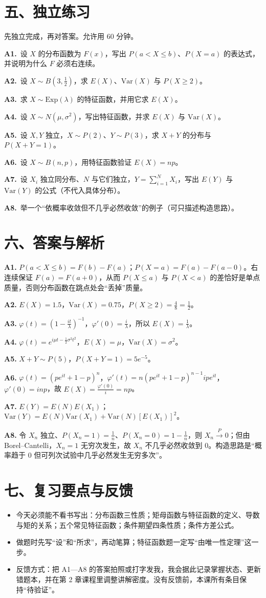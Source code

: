 \documentclass[UTF8,a4paper,11pt]{ctexart}
\newcommand{\CompactQuestion}[2]{\par\noindent\textbf{#1.}\ #2\par\vspace{.8em}}
\begin{document}
\section{五、独立练习}
先独立完成，再对答案。允许用 60 分钟。

\CompactQuestion{A1}{设 $X$ 的分布函数为 $F(x)$，写出 $P(a<X\le b)$、$P(X=a)$ 的表达式，并说明为什么 $F$ 必须右连续。}
\CompactQuestion{A2}{设 $X\sim B(3,\frac12)$，求 $E(X)$、$\mathrm{Var}(X)$ 与 $P(X\ge 2)$。}
\CompactQuestion{A3}{求 $X\sim \mathrm{Exp}(\lambda)$ 的特征函数，并用它求 $E(X)$。}
\CompactQuestion{A4}{设 $X\sim N(\mu,\sigma^2)$，写出特征函数，并求 $E(X)$ 与 $\mathrm{Var}(X)$。}
\CompactQuestion{A5}{设 $X,Y$ 独立，$X\sim P(2)$、$Y\sim P(3)$，求 $X+Y$ 的分布与 $P(X+Y=1)$。}
\CompactQuestion{A6}{设 $X\sim B(n,p)$，用特征函数验证 $E(X)=np$。}
\CompactQuestion{A7}{设 $X_i$ 独立同分布、$N$ 与它们独立，$Y=\sum_{i=1}^N X_i$，写出 $E(Y)$ 与 $\mathrm{Var}(Y)$ 的公式（不代入具体分布）。}
\CompactQuestion{A8}{举一个“依概率收敛但不几乎必然收敛”的例子（可只描述构造思路）。}
\clearpage
{}
\section{六、答案与解析}
\textbf{A1.} $P(a<X\le b)=F(b)-F(a)$；$P(X=a)=F(a)-F(a-0)$。右连续保证 $F(a)=F(a+0)$，从而 $P(X\le a)$ 与 $P(X<a)$ 的差恰好是单点质量，否则分布函数在跳点处会“丢掉”质量。

\textbf{A2.} $E(X)=1.5$，$\mathrm{Var}(X)=0.75$，$P(X\ge2)=\frac{4}{8}=\frac12$。

\textbf{A3.} $\varphi(t)=\left(1-\frac{it}{\lambda}\right)^{-1}$，$\varphi'(0)=\frac{i}{\lambda}$，所以 $E(X)=\frac{1}{\lambda}$。

\textbf{A4.} $\varphi(t)=e^{i\mu t-\frac12\sigma^2t^2}$，$E(X)=\mu$，$\mathrm{Var}(X)=\sigma^2$。

\textbf{A5.} $X+Y\sim P(5)$，$P(X+Y=1)=5e^{-5}$。

\textbf{A6.} $\varphi(t)=(pe^{it}+1-p)^n$，$\varphi'(t)=n(pe^{it}+1-p)^{n-1}ipe^{it}$，$\varphi'(0)=inp$，故 $E(X)=\frac{\varphi'(0)}{i}=np$。

\textbf{A7.} $E(Y)=E(N)E(X_1)$；$\mathrm{Var}(Y)=E(N)\mathrm{Var}(X_1)+\mathrm{Var}(N)[E(X_1)]^2$。

\textbf{A8.} 令 $X_n$ 独立、$P(X_n=1)=\frac1n$、$P(X_n=0)=1-\frac1n$，则 $X_n\xrightarrow{P}0$；但由 Borel–Cantelli，$X_n=1$ 无穷次发生，故 $X_n$ 不几乎必然收敛到 0。构造思路是“概率趋于 0 但可列次试验中几乎必然发生无穷多次”。

\section{七、复习要点与反馈}
\begin{itemize}
\item 今天必须能不看书写出：分布函数三性质；矩母函数与特征函数的定义、导数与矩的关系；五个常见特征函数；条件期望四条性质；条件方差公式。
\item 做题时先写“设”和“所求”，再动笔算；特征函数题一定写“由唯一性定理”这一步。
\item 反馈方式：把 A1—A8 的答案拍照或打字发我，我会据此记录掌握状态、更新错题本，并在第 2 章课程里调整讲解密度。没有反馈前，本课所有条目保持“待验证”。
\end{itemize}
\end{document}
